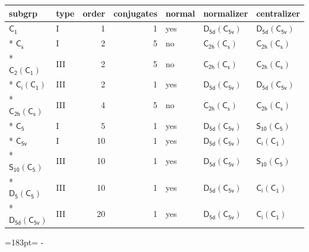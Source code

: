 \documentclass[10pt,a4paper]{article}
\newcommand{\needspace}[1]{\par\penalty-100\begingroup\dimen0=#1\relax\dimen2=\pagegoal
  \advance\dimen2-\pagetotal\ifdim\dimen0>\dimen2\relax\ifdim\dimen2>0pt\vfil\break\fi\fi
  \endgroup}
\numberwithin{equation}{section}
\newcommand{\grp}[1]{\mathsf{#1}}
\begin{document}
{\small\begin{longtable}{@{}llrrlll@{}}\toprule
subgrp & type & order & conjugates & normal & normalizer & centralizer\\\midrule\endhead
\bottomrule\endfoot\endlastfoot
\href{../../../rotation/data/pdf/C1.pdf}{$\grp{C_{1}}$} & I & 1 & 1 & yes & \href{D5d-C5v.pdf}{$\grp{D_{5d}}(\grp{C_{5v}})$} & \href{D5d-C5v.pdf}{$\grp{D_{5d}}(\grp{C_{5v}})$}\\*
\href{../../../rotation/data/pdf/C1v.pdf}{$\grp{C_{s}}$} & I & 2 & 5 & no & \href{C2h-C1v.pdf}{$\grp{C_{2h}}(\grp{C_{s}})$} & \href{C2h-C1v.pdf}{$\grp{C_{2h}}(\grp{C_{s}})$}\\*
\href{C2-C1.pdf}{$\grp{C_{2}}(\grp{C_{1}})$} & III & 2 & 5 & no & \href{C2h-C1v.pdf}{$\grp{C_{2h}}(\grp{C_{s}})$} & \href{C2h-C1v.pdf}{$\grp{C_{2h}}(\grp{C_{s}})$}\\*
\href{S2-C1.pdf}{$\grp{C_{i}}(\grp{C_{1}})$} & III & 2 & 1 & yes & \href{D5d-C5v.pdf}{$\grp{D_{5d}}(\grp{C_{5v}})$} & \href{D5d-C5v.pdf}{$\grp{D_{5d}}(\grp{C_{5v}})$}\\*
\href{C2h-C1v.pdf}{$\grp{C_{2h}}(\grp{C_{s}})$} & III & 4 & 5 & no & \href{C2h-C1v.pdf}{$\grp{C_{2h}}(\grp{C_{s}})$} & \href{C2h-C1v.pdf}{$\grp{C_{2h}}(\grp{C_{s}})$}\\*
\href{../../../rotation/data/pdf/C5.pdf}{$\grp{C_{5}}$} & I & 5 & 1 & yes & \href{D5d-C5v.pdf}{$\grp{D_{5d}}(\grp{C_{5v}})$} & \href{S10-C5.pdf}{$\grp{S_{10}}(\grp{C_{5}})$}\\*
\href{../../../rotation/data/pdf/C5v.pdf}{$\grp{C_{5v}}$} & I & 10 & 1 & yes & \href{D5d-C5v.pdf}{$\grp{D_{5d}}(\grp{C_{5v}})$} & \href{S2-C1.pdf}{$\grp{C_{i}}(\grp{C_{1}})$}\\*
\href{S10-C5.pdf}{$\grp{S_{10}}(\grp{C_{5}})$} & III & 10 & 1 & yes & \href{D5d-C5v.pdf}{$\grp{D_{5d}}(\grp{C_{5v}})$} & \href{S10-C5.pdf}{$\grp{S_{10}}(\grp{C_{5}})$}\\*
\href{D5-C5.pdf}{$\grp{D_{5}}(\grp{C_{5}})$} & III & 10 & 1 & yes & \href{D5d-C5v.pdf}{$\grp{D_{5d}}(\grp{C_{5v}})$} & \href{S2-C1.pdf}{$\grp{C_{i}}(\grp{C_{1}})$}\\*
\href{D5d-C5v.pdf}{$\grp{D_{5d}}(\grp{C_{5v}})$} & III & 20 & 1 & yes & \href{D5d-C5v.pdf}{$\grp{D_{5d}}(\grp{C_{5v}})$} & \href{S2-C1.pdf}{$\grp{C_{i}}(\grp{C_{1}})$}\\
\bottomrule\end{longtable}}
\needspace{183pt}
\end{document}

